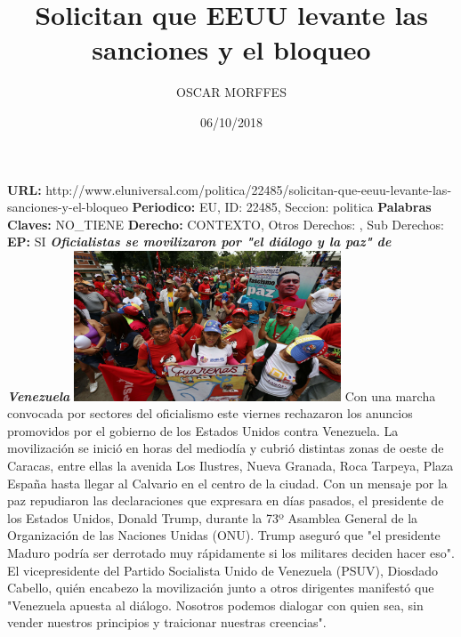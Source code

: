 \documentclass{article}%
\title{\textbf{Solicitan que EEUU levante las sanciones y el bloqueo}}%
\author{OSCAR  MORFFES}%
\date{06/10/2018}%
\begin{document}
%
\normalsize%
\maketitle%
\textbf{URL: }%
http://www.eluniversal.com/politica/22485/solicitan{-}que{-}eeuu{-}levante{-}las{-}sanciones{-}y{-}el{-}bloqueo\newline%
%
\textbf{Periodico: }%
EU, %
ID: %
22485, %
Seccion: %
politica\newline%
%
\textbf{Palabras Claves: }%
NO\_TIENE\newline%
%
\textbf{Derecho: }%
CONTEXTO, %
Otros Derechos: %
, %
Sub Derechos: %
\newline%
%
\textbf{EP: }%
SI\newline%
\newline%
%
\textbf{\textit{Oficialistas se movilizaron por "el diálogo y la paz" de Venezuela}}%
\newline%
\newline%
%
\includegraphics[width=300px]{6.jpg}%
\newline%
%
Con una marcha convocada por sectores del oficialismo este viernes rechazaron los anuncios promovidos por el gobierno de los Estados Unidos contra Venezuela.\newline%
La movilización se inició en horas del mediodía y cubrió distintas zonas de oeste de Caracas, entre ellas la avenida Los Ilustres, Nueva Granada, Roca Tarpeya, Plaza España hasta llegar al Calvario en el centro de la ciudad.%
\newline%
%
Con un mensaje por la paz repudiaron las declaraciones que expresara en días pasados,  el presidente de los Estados Unidos, Donald Trump, durante la 73º Asamblea General de la Organización de las Naciones Unidas (ONU).  Trump aseguró que "el presidente Maduro podría ser derrotado muy rápidamente si los militares deciden hacer eso".%
\newline%
%
El vicepresidente del Partido Socialista Unido de Venezuela (PSUV), Diosdado Cabello, quién encabezo la movilización junto a otros dirigentes manifestó que "Venezuela apuesta al diálogo. Nosotros podemos dialogar con quien sea, sin vender nuestros principios y traicionar nuestras creencias".%
\end{document}
